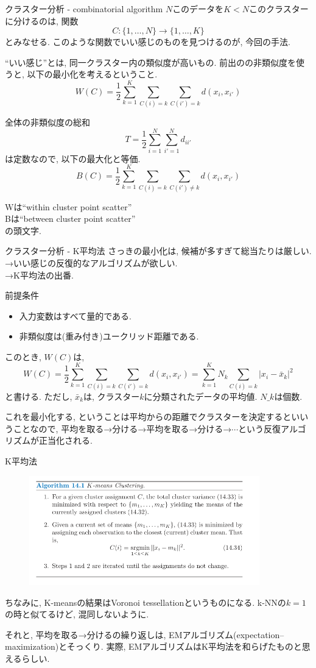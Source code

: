 \documentclass[dvipdfmx,8pt]{beamer}
\begin{document}
  \begin{frame}{クラスター分析 - combinatorial algorithm}
    $N$このデータを$K<N$このクラスターに分けるのは, 関数
    \[
      C \colon \{1,\dots,N\} \to \{1,\dots,K\}
    \]
    とみなせる. このような関数でいい感じのものを見つけるのが, 今回の手法.

    ``いい感じ''とは, 同一クラスター内の類似度が高いもの.
    前出のの非類似度を使うと, 以下の最小化を考えるということ.
    \[
      W(C)=\frac{1}{2}\sum_{k=1}^K\sum_{C(i)=k}\sum_{C(i')=k}d(x_i,x_{i'})
    \]

    全体の非類似度の総和
    \[
      T=\frac{1}{2}\sum_{i=1}^N\sum_{i'=1}^Nd_{ii'}
    \]
    は定数なので, 以下の最大化と等価.
    \[
      B(C)=\frac{1}{2}\sum_{k=1}^K\sum_{C(i)=k}\sum_{C(i')\ne k}d(x_i,x_{i'})
    \]

    Wは``within cluster point scatter''\\
    Bは``between cluster point scatter''\\
    の頭文字.
  \end{frame}
  \begin{frame}{クラスター分析 - K平均法}
    さっきの最小化は, 候補が多すぎて総当たりは厳しい. \\
    →いい感じの反復的なアルゴリズムが欲しい. \\
    →K平均法の出番.

    前提条件
    \begin{itemize}
      \item 入力変数はすべて量的である.
      \item 非類似度は(重み付き)ユークリッド距離である.
    \end{itemize}
    このとき, $W(C)$は,
    \[
      W(C)=\frac{1}{2}\sum_{k=1}^K\sum_{C(i)=k}\sum_{C(i')=k}d(x_i,x_{i'})=\sum_{k=1}^KN_k\sum_{C(i)=k}|x_i-\bar{x}_k|^2
    \]
    と書ける. ただし, $\bar{x}_k$は, クラスター$k$に分類されたデータの平均値. $N\_k$は個数.

    これを最小化する, ということは平均からの距離でクラスターを決定するといいうことなので,
    平均を取る→分ける→平均を取る→分ける→$\cdots$という反復アルゴリズムが正当化される.
  \end{frame}
  \begin{frame}{K平均法}
    \begin{figure}[htb]
      \centering
      \includegraphics[width=10cm,clip]{images/kmeans.png}
    \end{figure}

    ちなみに, K-meansの結果はVoronoi tessellationというものになる.
    k-NNの$k=1$の時と似てるけど, 混同しないように.

    それと, 平均を取る→分けるの繰り返しは, EMアルゴリズム(expectation–maximization)とそっくり.
    実際, EMアルゴリズムはK平均法を和らげたものと思えるらしい.
  \end{frame}
\end{document}
